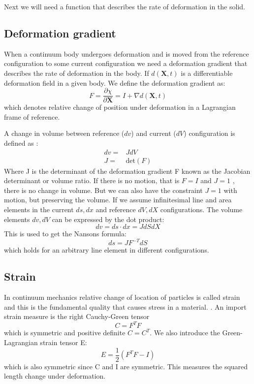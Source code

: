 Next we will need a function that describes the rate of deformation in the solid.
\subsection{Deformation gradient}
When a continuum body undergoes deformation and is moved from the reference configuration to some current configuration we need a deformation gradient that describes the rate of deformation in the body. 
If $d(\textbf{X},t)$ is a differentiable deformation field in a given body. We define the deformation gradient as:  
\begin{equation}
\label{eq:deformation_gradient}
F = \frac{\partial \chi}{\partial \textbf{X}} = I + \nabla d(\textbf{X},t) 
\end{equation}
which denotes relative change of position under deformation in a Lagrangian frame of reference.  

A change in volume between reference ($dv$) and current ($dV$) configuration is defined as :
\begin{align}
\label{eq:det_F}
dv =& J dV\\
J =& \text{det}(F)
\end{align}
Where J is the determinant of the deformation gradient F known as the Jacobian determinant or volume ratio. If there is no motion, that is $ F = I$ and $J=1$ , there is no change in volume. But we can also have the constraint $J=1$ with motion, but preserving the volume.
If we assume infinitesimal line and area elements in the current $ds, dx$ and reference $dV,dX$ configurations. The volume elements $dv, dV$ can be expressed by the dot product:
\begin{equation}
 dv = ds\cdot dx = J dS dX
\end{equation}
This is used to get the Nansons formula:
\begin{equation}\label{eq:Nanson}
ds = JF^{-T}dS
\end{equation}
which holds for an arbitrary line element in different configurations.

\subsection{Strain}
In continuum mechanics relative change of location of particles is called strain and this is the fundamental quality that causes stress in a material. \cite{Richter2016}. An import strain measure is the right Cauchy-Green tensor 
$$C = F^TF$$ 
which is symmetric and positive definite $C = C^T$.  We also introduce the Green-Lagrangian strain tensor E:
$$E = \frac{1}{2}(F^TF -I) $$
which is also symmetric since C and I are symmetric. This measures the squared length change under deformation.
		
